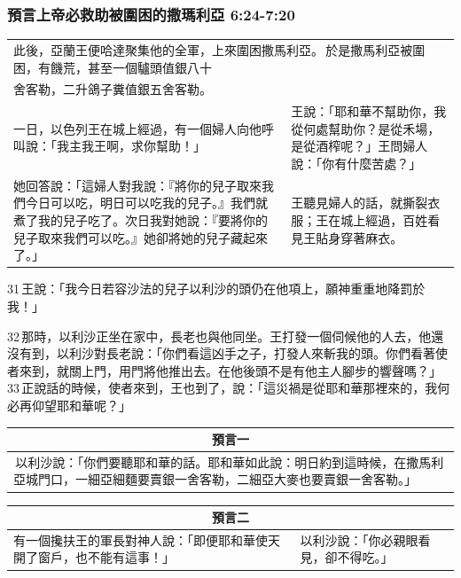 \subsubsection{預言上帝必救助被圍困的撒瑪利亞 6:24-7:20}
\begin{table}[H]
\centering
\begin{tabular}{p{}|p{7.75cm}}\hline
\multicolumn{2}{l}{此後，亞蘭王便哈達聚集他的全軍，上來圍困撒馬利亞。 於是撒馬利亞被圍困，有饑荒，甚至一個驢頭值銀八十}\\
\multicolumn{2}{l}{舍客勒，二升鴿子糞值銀五舍客勒。}\\\hline
一日，以色列王在城上經過，有一個婦人向他呼叫說：「我主我王啊，求你幫助！」&王說：「耶和華不幫助你，我從何處幫助你？是從禾場，是從酒榨呢？」王問婦人說：「你有什麼苦處？」\\\hline
她回答說：「這婦人對我說：『將你的兒子取來我們今日可以吃，明日可以吃我的兒子。』我們就煮了我的兒子吃了。次日我對她說：『要將你的兒子取來我們可以吃。』她卻將她的兒子藏起來了。」&王聽見婦人的話，就撕裂衣服；王在城上經過，百姓看見王貼身穿著麻衣。\\\hline
\end{tabular}
\end{table}

31 王說：「我今日若容沙法的兒子以利沙的頭仍在他項上，願神重重地降罰於我！」

32 那時，以利沙正坐在家中，長老也與他同坐。王打發一個伺候他的人去，他還沒有到，以利沙對長老說：「你們看這凶手之子，打發人來斬我的頭。你們看著使者來到，就關上門，用門將他推出去。在他後頭不是有他主人腳步的響聲嗎？」 33 正說話的時候，使者來到，王也到了，說：「這災禍是從耶和華那裡來的，我何必再仰望耶和華呢？」

\begin{tabular}{p{7.75cm}}\hline
\multicolumn{1}{c}{預言一}\\\hline
 以利沙說：「你們要聽耶和華的話。耶和華如此說：明日約到這時候，在撒馬利亞城門口，一細亞細麵要賣銀一舍客勒，二細亞大麥也要賣銀一舍客勒。」\\\hline
\end{tabular}
\quad
\begin{tabular}{p{4.15cm}|p{3.25cm}}\hline
\multicolumn{2}{c}{預言二}\\\hline
有一個攙扶王的軍長對神人說：「即便耶和華使天開了窗戶，也不能有這事！」&以利沙說：「你必親眼看見，卻不得吃。」\\\hline
\end{tabular}


